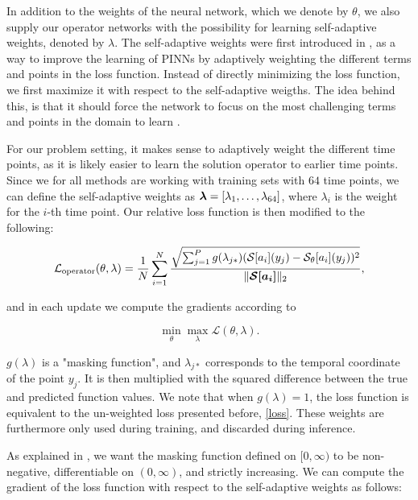 In addition to the weights of the neural network, which we denote by \(\theta\), we also supply 
our operator networks with the possibility for learning self-adaptive weights, denoted by \(\lambda\).
The self-adaptive weights were first introduced in , as a 
way to improve the learning of PINNs by adaptively weighting the different terms and points in the loss function. 
Instead of directly minimizing the loss function, we first maximize it with respect to the self-adaptive weigths. 
The idea behind this, is that it should force the network to focus on the most challenging terms and points in the domain to learn \cite{mcclennySelfAdaptivePhysicsInformedNeural2023a}.

For our problem setting, it makes sense to adaptively weight the different time points, as it is likely easier 
to learn the solution operator to earlier time points. Since we for all methods are working with training sets with \(64\) time points, 
we can define the self-adaptive weights as \(\bm{\lambda} = [\lambda_1, \ldots, \lambda_{64}]\), where \(\lambda_i\) is the weight for the \(i\)-th time point.
Our relative loss function is then modified to the following:

\begin{equation}
    \mathcal{L}_{\text{operator}}(\theta, \lambda) = 
    \frac{1}{N} \sum_{i=1}^{N} 
    \frac{\sqrt{\sum_{j=1}^P g(\lambda_{j*}) 
    (\mathcal{S}[a_i](y_j)-\mathcal{S}_\theta[a_i](y_j))^2}}
    {\|\bm{\mathcal{S}[a_i]}\|_2},
\end{equation}

and in each update we compute the gradients according to 

\begin{equation}
    \min_{\theta} \max_{\lambda}
    \mathcal{L}(\theta, \lambda). 
\end{equation}

\(g(\lambda)\) is a "masking function", and \(\lambda_{j*}\) corresponds to the temporal coordinate of the point \(y_j\). 
It is then multiplied with the squared difference between the true and predicted function values.
We note that when \(g(\lambda) = 1\), the loss function is equivalent to the un-weighted loss presented before, \cref{loss}.
These weights are furthermore only used during training, and discarded during inference.

As explained in , 
we want the masking function defined on \([0, \infty)\) to be 
non-negative, differentiable on \((0, \infty)\), 
and strictly increasing. We can compute the gradient of the loss function with respect to the self-adaptive weights as follows:

